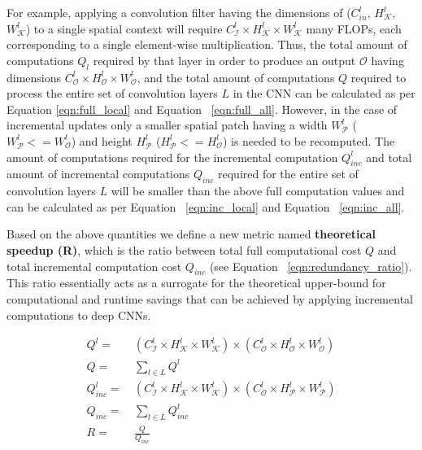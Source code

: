 For example, applying a convolution filter having the dimensions of ($C^l_{in}$, $H^l_{\mathcal{K}}$, $W^l_{\mathcal{K}}$) to a single spatial context will require $C^l_{\mathcal{I}} \times H^l_{\mathcal{K}} \times W^l_{\mathcal{K}}$ many FLOPs, each corresponding to a single element-wise multiplication. Thus, the total amount of computations $Q_l$ required by that layer in order to produce an output $\mathcal{O}$ having dimensions $C^l_{\mathcal{O}} \times H^l_{\mathcal{O}} \times W^l_{\mathcal{O}}$, and the total amount of computations $Q$ required to process the entire set of convolution layers $L$ in the CNN can be calculated as per Equation \ref{eqn:full_local} and Equation ~\ref{eqn:full_all}. However, in the case of incremental updates only a smaller spatial patch having a width $W^l_\mathcal{P}$ ($W^l_\mathcal{P}<=W^l_{\mathcal{O}}$) and height $H^l_\mathcal{P}$ ($H^l_\mathcal{P}<=H^l_{\mathcal{O}}$) is needed to be recomputed. The amount of computations required for the incremental computation $Q^l_{inc}$ and total amount of incremental computations $Q_{inc}$ required for the entire set of convolution layers $L$ will be smaller than the above full computation values and can be calculated as per Equation ~\ref{eqn:inc_local} and Equation ~\ref{eqn:inc_all}.

Based on the above quantities we define a new metric named \textbf{theoretical speedup (R)}, which is the ratio between total full computational cost $Q$ and total incremental computation cost $Q_{inc}$ (see Equation ~\ref{eqn:redundancy_ratio}). This ratio essentially acts as a surrogate for the theoretical upper-bound for computational and runtime savings that can be achieved by applying incremental computations to deep CNNs.

\begin{align}
\label{eqn:full_local}
Q^l =&~ (C^l_{\mathcal{I}} \times H^l_{\mathcal{K}} \times W^l_{\mathcal{K}}) \times (C^l_{\mathcal{O}} \times H^l_{\mathcal{O}} \times W^l_{\mathcal{O}})\\
\label{eqn:full_all}
Q =&~ \sum_{l \in L} Q^l\\
\label{eqn:inc_local}
Q_{inc}^l =&~ (C^l_{\mathcal{I}} \times H^l_{\mathcal{K}} \times W^l_{\mathcal{K}}) \times (C^l_{\mathcal{O}} \times H^l_{\mathcal{P}} \times W^l_{\mathcal{P}})\\
\label{eqn:inc_all}
Q_{inc} =&~ \sum_{l \in L} Q^l_{inc}\\
\label{eqn:redundancy_ratio}
R =&~ \frac{Q}{Q_{inc}}
\end{align}


